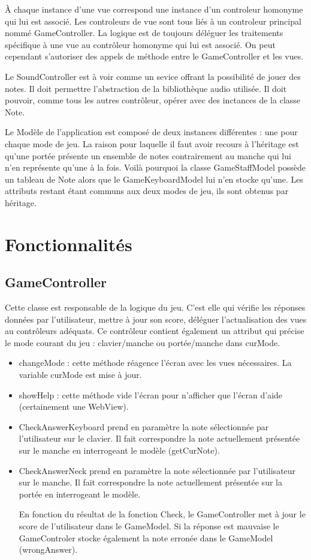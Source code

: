 \documentclass{scrreprt}
\begin{document}
À chaque instance d'une vue correspond une instance d'un controleur homonyme qui lui est associé.
Les controleurs de vue sont tous liés à un controleur principal nommé GameController.
La logique est de toujours déléguer les traitements spécifique à une vue au contrôleur homonyme qui lui est associé.
On peut cependant s'autoriser des appels de méthode entre le GameController et les vues.

Le SoundController est à voir comme un sevice offrant la possibilité de jouer des notes.
Il doit permettre l'abstraction de la bibliothèque audio utilisée.
Il doit pouvoir, comme tous les autres contrôleur, opérer avec des inctances de la classe Note.

Le Modèle de l'application est composé de deux instances différentes : une pour chaque mode de jeu.
La raison pour laquelle il faut avoir recours à l'héritage est qu'une portée présente un ensemble de notes contrairement au manche qui lui n'en représente qu'une à la fois.
Voilà pourquoi la classe GameStaffModel possède un tableau de Note alors que le GameKeyboardModel lui n'en stocke qu'une. 
Les attributs restant étant communs aux deux modes de jeu, ils sont obtenus par héritage.


\section{Fonctionnalités}

\subsection{GameController}

Cette classe est responsable de la logique du jeu. C'est elle qui vérifie les réponses données par \mbox{l'utilisateur}, mettre à jour son score, déléguer l'actualisation des vues au contrôleurs adéquats.
Ce contrôleur contient également un attribut qui précise le mode courant du jeu : clavier/manche ou portée/manche dans curMode. 
\begin{itemize}
\item changeMode : cette méthode réagence l’écran avec les vues nécessaires. La variable curMode est mise à jour.
\item showHelp : cette méthode vide l’écran pour n’afficher que l’écran d’aide (certainement une WebView).


\item CheckAnswerKeyboard prend en paramètre la note sélectionnée par l’utilisateur sur le clavier. Il fait correspondre la note actuellement présentée sur le manche en interrogeant le modèle (getCurNote).
\item CheckAnswerNeck prend en paramètre la note sélectionnée par l’utilisateur sur le manche. Il fait correspondre la note actuellement présentée sur la portée en interrogeant le modèle.

En fonction du résultat de la fonction Check, le GameController met à jour le score de l’utilisateur dans le GameModel. Si la réponse est mauvaise le GameControler stocke également la note erronée dans le GameModel (wrongAnswer). 
 
\end{itemize}
\end{document}
